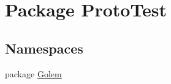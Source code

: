 \hypertarget{namespace_proto_test}{\section{Package Proto\-Test}
\label{namespace_proto_test}
}
\subsection*{Namespaces}
\begin{DoxyCompactItemize}
\item 
package \hyperlink{namespace_proto_test_1_1_golem}{Golem}
\end{DoxyCompactItemize}
